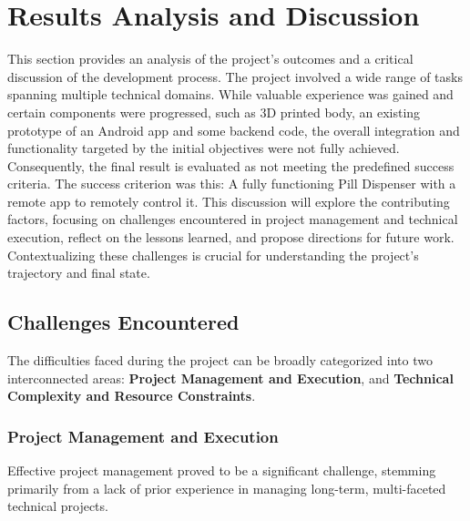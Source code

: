 \section{Results Analysis and Discussion}\label{sec:discussion}

This section provides an analysis of the project's outcomes and a critical discussion of the development process. The project involved a wide range of tasks spanning multiple technical domains. While valuable experience was gained and certain components were progressed, such as 3D printed body, an existing prototype of an Android app and some backend code, the overall integration and functionality targeted by the initial objectives were not fully achieved. Consequently, the final result is evaluated as not meeting the predefined success criteria. The success criterion was this: A fully functioning Pill Dispenser with a remote app to remotely control it. This discussion will explore the contributing factors, focusing on challenges encountered in project management and technical execution, reflect on the lessons learned, and propose directions for future work. Contextualizing these challenges is crucial for understanding the project's trajectory and final state.

\subsection{Challenges Encountered}

The difficulties faced during the project can be broadly categorized into two interconnected areas: \textbf{Project Management and Execution}, and \textbf{Technical Complexity and Resource Constraints}.

\subsubsection{Project Management and Execution}

Effective project management proved to be a significant challenge, stemming primarily from a lack of prior experience in managing long-term, multi-faceted technical projects.

